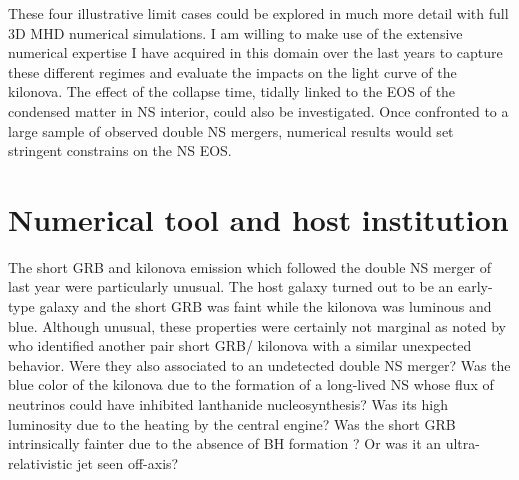 \documentclass[12pt,onecolumn]{article}
\makeatletter
\newcommand{\grb}{GRB\xspace}
\newcommand{\eos}{EOS\xspace}
\newcommand{\mhd}{MHD\xspace}
\newcommand*{\ns}{NS\@\xspace}
\newcommand*{\bh}{BH\@\xspace}
\makeatother
\begin{document}
These four illustrative limit cases could be explored in much more detail with full 3D \mhd numerical simulations. I am willing to make use of the extensive numerical expertise I have acquired in this domain over the last years to capture these different regimes and evaluate the impacts on the light curve of the kilonova. The effect of the collapse time, tidally linked to the \eos of the condensed matter in \ns interior, could also be investigated. Once confronted to a large sample of observed double \ns mergers, numerical results would set stringent constrains on the \ns \eos.






\section{Numerical tool and host institution}

The short \grb and kilonova emission which followed the double \ns merger of last year were particularly unusual. The host galaxy turned out to be an early-type galaxy and the short \grb was faint while the kilonova was luminous and blue. Although unusual, these properties were certainly not marginal as noted by \citet{Troja2018} who identified another pair short \grb\xspace/ kilonova with a similar unexpected behavior. Were they also associated to an undetected double \ns merger? Was the blue color of the kilonova due to the formation of a long-lived \ns whose flux of neutrinos could have inhibited lanthanide nucleosynthesis? Was its high luminosity due to the heating by the central engine? Was the short \grb intrinsically fainter due to the absence of \bh formation \citep{Murguia-Berthier2014,Murguia-Berthier2017a}? Or was it an ultra-relativistic jet seen off-axis? 
\end{document}
